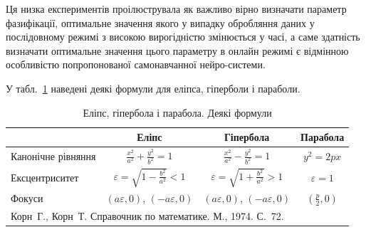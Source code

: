 \documentclass{vakthesis}
\begin{document}
Ця низка експериментів проілюструвала як важливо вірно визначати параметр фазифікації, оптимальне значення якого у випадку обробляння даних у послідовному режимі з високою вирогідністю змінюється у часі, а саме здатність визначати оптимальне значення цього параметру в онлайн режимі є відмінною особливістю попропонованої самонавчанної нейро-системи.

У табл.~\ref{tab:ellipse.hyperbola.parabola} наведені деякі
формули для еліпса, гіперболи і параболи.

\begin{table}[htbp]
\caption{Еліпс, гіпербола і парабола. Деякі формули}
\label{tab:ellipse.hyperbola.parabola}
\begin{tabularx}{\textwidth}{|X|c|c|c|}
\hline
                   & Еліпс                                    & Гіпербола                                & Парабола          \\
\hline
Канонічне рівняння & $\frac{x^2}{a^2}+\frac{y^2}{b^2}=1$      & $\frac{x^2}{a^2}-\frac{y^2}{b^2}=1$      & $y^2=2px$         \\
Ексцентриситет     & $\varepsilon=\sqrt{1-\frac{b^2}{a^2}}<1$ & $\varepsilon=\sqrt{1+\frac{b^2}{a^2}}>1$ & $\varepsilon=1$   \\
Фокуси             & $(a\varepsilon,0)$, $(-a\varepsilon,0)$  & $(a\varepsilon,0)$, $(-a\varepsilon,0)$  & $(\frac{p}{2},0)$ \\
\hline
\multicolumn{4}{|l|}{Корн~Г., Корн~Т. Справочник по математике. М., 1974. С.~72.} \\
\hline
\end{tabularx}
\end{table}



	
\end{document}
